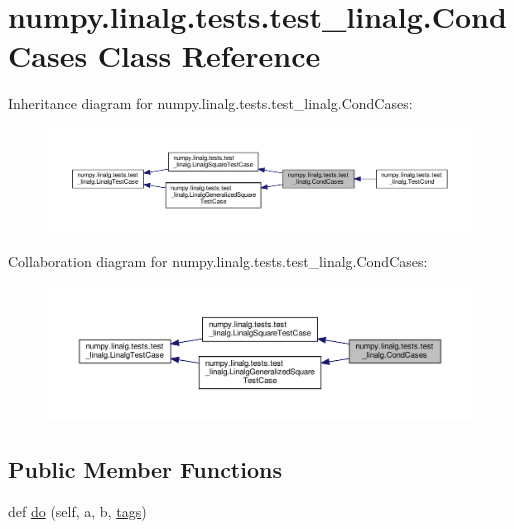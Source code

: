 \hypertarget{classnumpy_1_1linalg_1_1tests_1_1test__linalg_1_1CondCases}{}\section{numpy.\+linalg.\+tests.\+test\+\_\+linalg.\+Cond\+Cases Class Reference}
\label{classnumpy_1_1linalg_1_1tests_1_1test__linalg_1_1CondCases}


Inheritance diagram for numpy.\+linalg.\+tests.\+test\+\_\+linalg.\+Cond\+Cases\+:
\nopagebreak
\begin{figure}[H]
\begin{center}
\leavevmode
\includegraphics[width=350pt]{classnumpy_1_1linalg_1_1tests_1_1test__linalg_1_1CondCases__inherit__graph}
\end{center}
\end{figure}


Collaboration diagram for numpy.\+linalg.\+tests.\+test\+\_\+linalg.\+Cond\+Cases\+:
\nopagebreak
\begin{figure}[H]
\begin{center}
\leavevmode
\includegraphics[width=350pt]{classnumpy_1_1linalg_1_1tests_1_1test__linalg_1_1CondCases__coll__graph}
\end{center}
\end{figure}
\subsection*{Public Member Functions}
\begin{DoxyCompactItemize}
\item 
def \hyperlink{classnumpy_1_1linalg_1_1tests_1_1test__linalg_1_1CondCases_aef8829dcd780e17e13593b49a2ff3a2f}{do} (self, a, b, \hyperlink{namespacenumpy_1_1linalg_1_1tests_1_1test__linalg_ac6a064918e74d701a7b5aac0ffefe1e7}{tags})
\end{DoxyCompactItemize}
